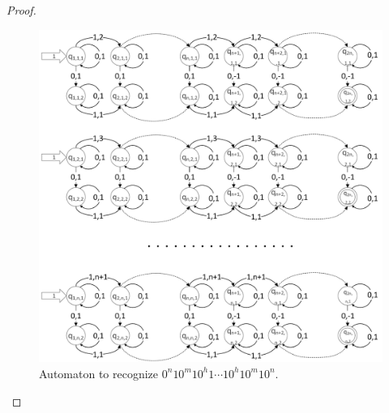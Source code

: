\documentclass{llncs}
\begin{document}
\begin{proof}
\begin{figure}[h!]
\centering
\includegraphics[width=\textwidth]{Img/1pfa.pdf}
\caption{Automaton to recognize $0^n10^m10^h1 \cdots 10^h10^m10^n$.}
\label{fig:1pfa}
\end{figure}


\end{proof}
\end{document}
